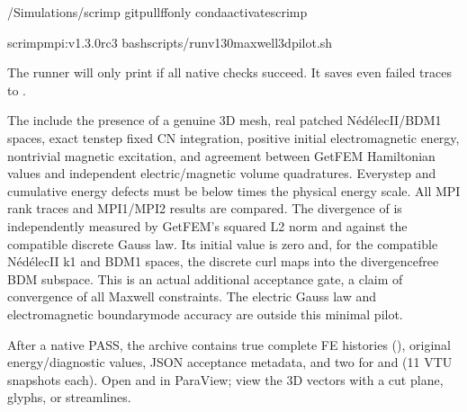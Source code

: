 \documentclass[letterpaper,10pt,english]{sphinxmanual}
\begin{document}
\begin{sphinxVerbatim}[commandchars=\\\{\}]
\PYGZti{}/Simulations/scrimp
gitpull\PYGZhy{}\PYGZhy{}ff\PYGZhy{}only
condaactivatescrimp

scrimp\PYGZhy{}mpi:v1.3.0\PYGZhy{}rc3
bashscripts/run\PYGZhy{}v130\PYGZhy{}maxwell3d\PYGZhy{}pilot.sh
\end{sphinxVerbatim}

\sphinxAtStartPar
The runner will only print
 if all
native checks succeed. It saves even
failed traces to
.

\sphinxAtStartPar
The  include the
presence of a genuine 3D mesh,
real patched Nédélec\sphinxhyphen{}II/BDM1 spaces, exact ten\sphinxhyphen{}step
fixed CN integration, positive initial
electromagnetic energy, nontrivial magnetic
excitation, and agreement between GetFEM
Hamiltonian values and independent
electric/magnetic volume quadratures.
Every\sphinxhyphen{}step and cumulative energy defects
must be below  times the
physical energy scale. All MPI rank traces
and MPI1/MPI2 results are compared.
The divergence of  is independently
measured by GetFEM’s squared L2 norm
and  against the compatible
discrete Gauss law. Its initial value is
zero and, for the compatible Nédélec\sphinxhyphen{}II k1
and BDM1 spaces, the discrete curl maps into
the divergence\sphinxhyphen{}free BDM subspace. This is an
actual additional acceptance gate,
 a claim of convergence of all
Maxwell constraints. The electric Gauss
law and electromagnetic boundary\sphinxhyphen{}mode
accuracy are outside this minimal pilot.

\sphinxAtStartPar
After a native PASS, the archive contains
true complete FE histories (),
original energy/diagnostic values, JSON
acceptance metadata, and two  for 
and  (11 VTU snapshots each).
Open  and
 in ParaView;
view the 3D vectors with a cut plane,
glyphs, or streamlines.
\end{document}
